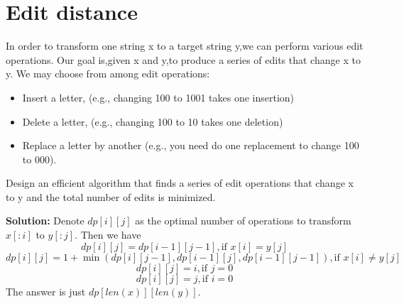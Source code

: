 \section{Edit distance}

In order to transform one string x to a target string y,we can perform various edit operations. Our goal is,given x and y,to produce a series of edits that change x to y. We may choose from among edit operations:
\begin{itemize}
\item Insert a letter, (e.g., changing 100 to 1001 takes one insertion) 
\item Delete a letter, (e.g., changing 100 to 10 takes one deletion) 
\item Replace a letter by another (e.g., you need do one replacement to change 100 to 000).
\end{itemize}
Design an efficient algorithm that finds a series of edit operations that change x to y and the total number of edits is minimized. 

{\bf Solution:} Denote $dp[i][j]$ as the optimal number of operations to transform $x[:i]$ to $y[:j]$. Then we have
\[
dp[i][j] = dp[i-1][j-1], \text{if } x[i]=y[j]
\]
\[
dp[i][j] = 1+\min(dp[i][j-1], dp[i-1][j], dp[i-1][j-1]), \text{if } x[i]\ne y[j]
\]
\[
dp[i][j] = i, \text{if } j=0
\]
\[
dp[i][j] = j, \text{if } i=0
\]
The answer is just $dp[len(x)][len(y)]$.